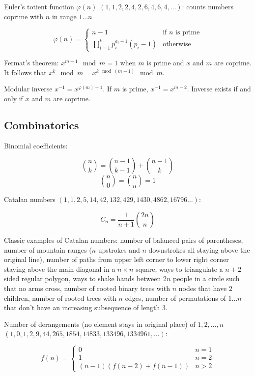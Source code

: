 \documentclass{article}
\begin{document}
Euler's totient function $\varphi(n)$ $(1, 1, 2, 2, 4, 2, 6, 4, 6, 4, \dots)$: counts numbers coprime with $n$ in range $1 \dots n$

\[
	\varphi(n) =
	\begin{cases}
		n-1 &\text{if $n$ is prime} \\
		\prod_{i=1}^{k} p_i^{a_i-1}(p_i-1) &\text{otherwise}
	\end{cases}
\]

Fermat's theorem: $x^{m-1} \mod m = 1$ when $m$ is prime and $x$ and $m$ are coprime. It follows that $x^k \mod m = x^{k \mod (m-1)} \mod m$.

Modular inverse $x^{-1} = x^{\varphi(m)-1}$. If $m$ is prime, $x^{-1} = x^{m-2}$. Inverse exists if and only if $x$ and $m$ are coprime.

\subsection {Combinatorics}

Binomial coefficients:

\[ \binom{n}{k} = \binom{n-1}{k-1} + \binom{n-1}{k} \]
\[ \binom{n}{0} = \binom{n}{n} = 1 \]

Catalan numbers $(1, 1, 2, 5, 14, 42, 132, 429, 1430, 4862, 16796 \dots)$:

\[ C_n = \frac{1}{n+1} \binom{2n}{n} \]

Classic examples of Catalan numbers: number of balanced pairs of parentheses,  number of mountain ranges ($n$ upstrokes and $n$ downstrokes all staying above the original line), number of paths from upper left corner to lower right corner staying above the main diagonal in a $n \times n$ square, ways to triangulate a $n+2$ sided regular polygon, ways to shake hands between $2n$ people in a circle such that no arms cross, number of rooted binary trees with $n$ nodes that have $2$ children, number of rooted trees with $n$ edges, number of permutations of $1 \dots n$ that don't have an increasing subsequence of length $3$.

Number of derangements (no element stays in original place) of $1, 2, \dots, n$ $(1, 0, 1, 2, 9, 44, 265, 1854, 14833, 133496, 1334961, \dots)$:

\[
	f(n) =
	\begin{cases}
		0 &n = 1 \\
		1 &n = 2 \\
		(n-1)(f(n-2)+f(n-1)) &n > 2
	\end{cases}
\]
\end{document}
